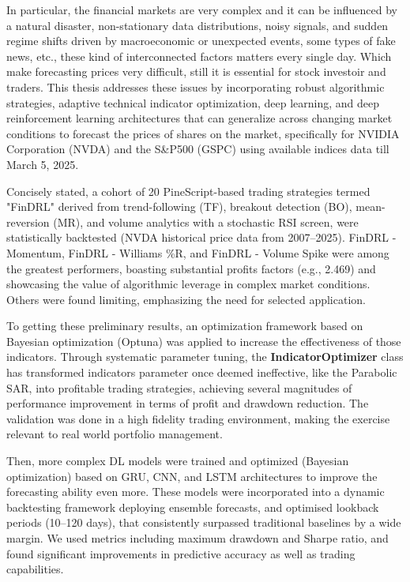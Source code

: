 In particular, the financial markets are very complex and it can be influenced by a natural disaster, non-stationary data distributions, noisy signals, and sudden regime shifts driven by macroeconomic or unexpected events, some types of fake news, etc., these kind of interconnected factors matters every single day. Which make forecasting prices very difficult, still it is essential for stock investoir and traders. This thesis addresses these issues by incorporating robust algorithmic strategies, adaptive technical indicator optimization, deep learning, and deep reinforcement learning architectures that can generalize across changing market conditions to forecast the prices of shares on the market, specifically for NVIDIA Corporation (NVDA) and the S\&P500 (GSPC) using available indices data till March 5, 2025.

Concisely stated, a cohort of 20 PineScript-based trading strategies termed "FinDRL" derived from trend-following (TF), breakout detection (BO), mean-reversion (MR), and volume analytics with a stochastic RSI screen, were statistically backtested (NVDA historical price data from 2007–2025). FinDRL - Momentum, FinDRL - Williams \%R, and FinDRL - Volume Spike were among the greatest performers, boasting substantial profits factors (e.g., 2.469) and showcasing the value of algorithmic leverage in complex market conditions. Others were found limiting, emphasizing the need for selected application.

To getting these preliminary results, an optimization framework based on Bayesian optimization (Optuna) was applied to increase the effectiveness of those indicators. Through systematic parameter tuning, the \textbf{IndicatorOptimizer} class has transformed indicators parameter once deemed ineffective, like the Parabolic SAR, into profitable trading strategies, achieving several magnitudes of performance improvement in terms of profit and drawdown reduction. The validation was done in a high fidelity trading environment, making the exercise relevant to real world portfolio management.

Then, more complex DL models were trained and optimized (Bayesian optimization) based on GRU, CNN, and LSTM architectures to improve the forecasting ability even more. These models were incorporated into a dynamic backtesting framework deploying ensemble forecasts, and optimised lookback periods (10–120 days), that consistently surpassed traditional baselines by a wide margin. We used metrics including maximum drawdown and Sharpe ratio, and found significant improvements in predictive accuracy as well as trading capabilities.

